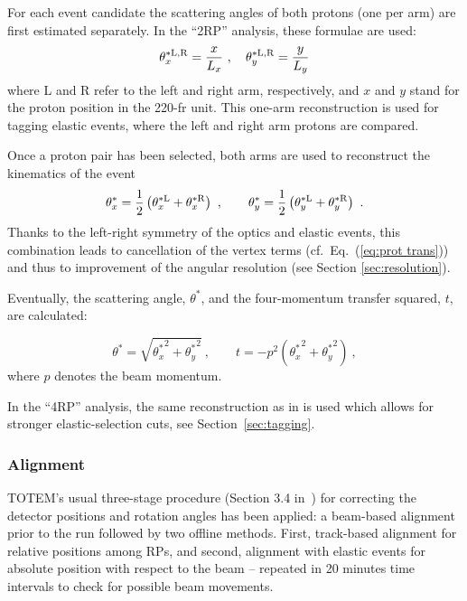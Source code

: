 For each event candidate the scattering angles of both protons (one per arm) are first estimated separately. In the ``2RP'' analysis, these formulae are used:
\begin{equation}
\label{eq:kin 1a}
	\theta^{*\rm L,R}_x = {x\over L_x}\ ,\quad \theta^{*\rm L,R}_y = {y\over L_y}
\end{equation}
where L and R refer to the left and right arm, respectively, and $x$ and $y$ stand for the proton position in the 220-fr unit. This one-arm reconstruction is used for tagging elastic events, where the left and right arm protons are compared.

Once a proton pair has been selected, both arms are used to reconstruct the kinematics of the event
\begin{equation}
\label{eq:kin 2a}
		\theta_x^* = {1\over 2} \left( \theta^{*\rm L}_x + \theta^{*\rm R}_x \right)\ ,\qquad
		\theta_y^* = {1\over 2} \left( \theta^{*\rm L}_y + \theta^{*\rm R}_y \right)\ .
\end{equation}
Thanks to the left-right symmetry of the optics and elastic events, this combination leads to cancellation of the vertex terms (cf.~Eq.~(\ref{eq:prot trans})) and thus to improvement of the angular resolution (see Section \ref{sec:resolution}).

Eventually, the scattering angle, $\theta^*$, and the four-momentum transfer squared, $t$, are calculated:

\begin{equation}
\label{eq:th t}
\theta^* = \sqrt{{\theta_x^*}^2 + {\theta_y^*}^2}\ ,\qquad t = - p^2 ({\theta_x^*}^2 + {\theta_y^*}^2)\ ,
\end{equation}
where $p$ denotes the beam momentum.

In the ``4RP'' analysis, the same reconstruction as in \cite{totem-8tev-1km} is used which allows for stronger elastic-selection cuts, see Section~\ref{sec:tagging}.




\subsubsection{Alignment}
\label{sec:alignment}

TOTEM's usual three-stage procedure (Section 3.4 in~\cite{totem-ijmp}) for correcting the detector positions and rotation angles has been applied: a beam-based alignment prior to the run followed by two offline methods. First, track-based alignment for relative positions among RPs, and second, alignment with elastic events for absolute position with respect to the beam -- repeated in 20 minutes time intervals to check for possible beam movements.

